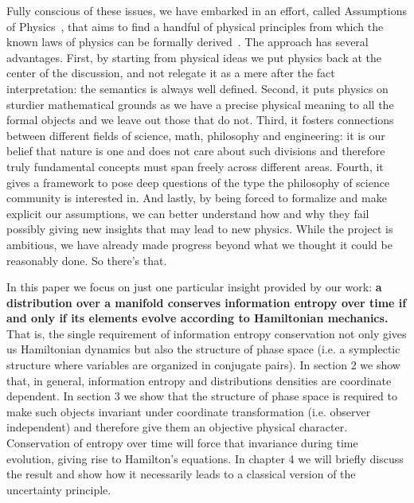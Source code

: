 \documentclass[11pt]{article}
\begin{document}
Fully conscious of these issues, we have embarked in an effort, called Assumptions of Physics~\cite{carc1}, that aims to find a handful of physical principles from which the known laws of physics can be formally derived~\cite{carc2}. The approach has several advantages. First, by starting from physical ideas we put physics back at the center of the discussion, and not relegate it as a mere after the fact interpretation: the semantics is always well defined. Second, it puts physics on sturdier mathematical grounds as we have a precise physical meaning to all the formal objects and we leave out those that do not. Third, it fosters connections between different fields of science, math, philosophy and engineering: it is our belief that nature is one and does not care about such divisions and therefore truly fundamental concepts must span freely across different areas. Fourth, it gives a framework to pose deep questions of the type the philosophy of science community is interested in. And lastly, by being forced to formalize and make explicit our assumptions, we can better understand how and why they fail possibly giving new insights that may lead to new physics. While the project is ambitious, we have already made progress beyond what we thought it could be reasonably done. So there's that.

In this paper we focus on just one particular insight provided by our work: \textbf{a distribution over a manifold conserves information entropy over time if and only if its elements evolve according to Hamiltonian mechanics.} That is, the single requirement of information entropy conservation not only gives us Hamiltonian dynamics but also the structure of phase space (i.e. a symplectic structure where variables are organized in conjugate pairs). In section 2 we show that, in general, information entropy and distributions densities are coordinate dependent. In section 3 we show that the structure of phase space is required to make such objects invariant under coordinate transformation (i.e. observer independent) and therefore give them an objective physical character. Conservation of entropy over time will force that invariance during time evolution, giving rise to Hamilton's equations. In chapter 4 we will briefly discuss the result and show how it necessarily leads to a classical version of the uncertainty principle.
\end{document}

